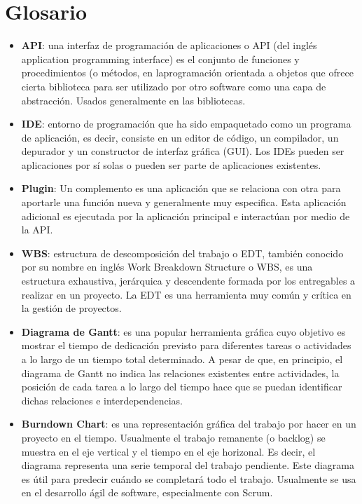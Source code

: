 \documentclass[12pt,a4paper]{article}
\begin{document}
	\section{Glosario}



\begin{itemize}

\item \textbf{API}: una interfaz de programación de aplicaciones o API (del inglés application programming interface) es el conjunto de funciones y procedimientos (o métodos, en laprogramación orientada a objetos que ofrece cierta biblioteca para ser utilizado por otro software como una capa de abstracción. Usados generalmente en las bibliotecas.

\item \textbf{IDE}: entorno de programación que ha sido empaquetado como un programa de aplicación, es decir, consiste en un editor de código, un compilador, un depurador y un constructor de interfaz gráfica (GUI). Los IDEs pueden ser aplicaciones por sí solas o pueden ser parte de aplicaciones existentes.

\item \textbf{Plugin}: Un complemento es una aplicación que se relaciona con otra para aportarle una función nueva y generalmente muy especifica. Esta aplicación adicional es ejecutada por la aplicación principal e interactúan por medio de la API.

\item \textbf{WBS}: estructura de descomposición del trabajo o EDT, también conocido por su nombre en inglés Work Breakdown Structure o WBS, es una estructura exhaustiva, jerárquica y descendente formada por los entregables a realizar en un proyecto. La EDT es una herramienta muy común y crítica en la gestión de proyectos.

\item \textbf{Diagrama de Gantt}: es una popular herramienta gráfica cuyo objetivo es mostrar el tiempo de dedicación previsto para diferentes tareas o actividades a lo largo de un tiempo total determinado. A pesar de que, en principio, el diagrama de Gantt no indica las relaciones existentes entre actividades, la posición de cada tarea a lo largo del tiempo hace que se puedan identificar dichas relaciones e interdependencias.

\item \textbf{Burndown Chart}: es una representación gráfica del trabajo por hacer en un proyecto en el tiempo. Usualmente el trabajo remanente (o backlog) se muestra en el eje vertical y el tiempo en el eje horizonal. Es decir, el diagrama representa una serie temporal  del trabajo pendiente. Este diagrama es útil para predecir cuándo se completará todo el trabajo. Usualmente se usa en el desarrollo ágil de software, especialmente con Scrum.

\end{itemize}
\end{document}
